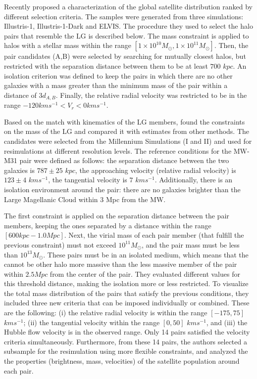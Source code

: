\documentclass[fleqn,usenatbib]{mnras}
\begin{document}
Recently \cite{2018MNRAS.478.5533F} proposed a characterization of the
global satellite distribution ranked by different selection
criteria. The samples were generated from three simulations:
Illustris-1, Illustris-1-Dark and ELVIS. The procedure they used to
select the halo pairs that resemble the LG is described below. The
mass constraint is applied to halos with a stellar mass within the
range $[1\times 10^{10} M_\odot, 1\times 10^{11} M_\odot]$. Then, the
pair candidates (A,B) were selected by searching for mutually closest
halos, but restricted with the separation distance between them to be
at least $700$ $kpc$. An isolation criterion was defined to keep the
pairs in which there are no other galaxies with a mass greater than
the minimum mass of the pair within a distance of $3d_{A,B}$. Finally,
the relative radial velocity was restricted to be in the range $-120
kms^{-1}<V_r<0 km s^{-1}$.  


Based on the match with kinematics of the LG members,
\cite{fattahi2016apostle} found the constraints on the mass of the LG
and compared it with estimates from other methods. The candidates were
selected from the Millennium Simulations (I and II) and used for
resimulations at different resolution levels. The reference conditions
for the MW-M31 pair were defined as follows: the separation distance
between the two galaxies is $787 \pm 25$ $kpc$, the approaching
velocity (relative radial velocity) is $123 \pm 4$ $kms^{-1}$, the
tangential velocity is $7$ $kms^{-1}$. Additionally, there is an
isolation environment around \cite{forero2018we}  
the pair: there are no galaxies brighter than the Large Magellanic Cloud within 3 Mpc from the MW.  

The first constraint is applied on the separation distance between the pair members, keeping the ones separated by a distance within the range $[600kpc-1.0Mpc]$. Next, the virial mass of each pair member (that fulfill the previous constraint) must not exceed $10^{11} M_\odot$, and the pair mass must be less than $10^{13} M_\odot$. These pairs must be in an isolated medium, which means that the cannot be other halo more massive than the less massive member of the pair within $2.5Mpc$ from the center of the pair. They evaluated different values for this threshold distance, making the isolation more or less restricted. To visualize the total mass distribution of the pairs that satisfy the previous conditions, they included three new criteria that can be imposed individually or combined. These are the following: (i) the relative radial velocity is within the range $[-175,75]$ $kms^{-1}$; (ii) the tangential velocity within the range $[0,50]$ $kms^{-1}$, and (iii) the Hubble flow velocity is in the observed range. Only 14 pairs satisfied the velocity criteria simultaneously. Furthermore, from these 14 pairs, the authors selected a subsample for the resimulation using more flexible constraints, and analyzed the the properties (brightness, mass, velocities) of the satellite population around each pair.
\end{document}

